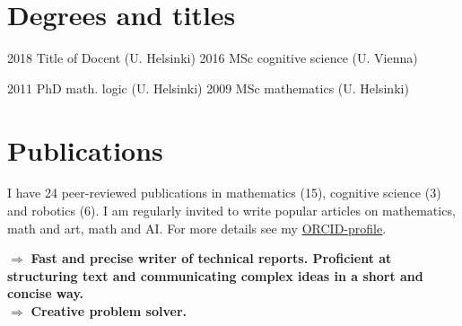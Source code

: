 \documentclass[letterpaper]{twentyonesecondcv}
\begin{document}
{\section{Degrees and titles}
   \vspace{-20pt}
   \begin{multicols}{2}
    \begin{twentyshort}
      \twentyitemshort
        {2018}
        {Title of Docent (U. Helsinki)}
      \twentyitemshort
        {2016}
        {MSc cognitive science (U. Vienna)}
    \end{twentyshort}
    \begin{twentyshort}
      \twentyitemshort
        {2011}
        {PhD math. logic (U. Helsinki)}
      \twentyitemshort
        {2009}
        {MSc mathematics (U. Helsinki)}
    \end{twentyshort}
   \end{multicols}

   \vspace{-20pt}

    \section{Publications}    

    
      \noindent I have 24 peer-reviewed publications in
      mathematics (15), cognitive science (3) and robotics (6).
      I am regularly invited to write
      popular articles on mathematics, math and art, math and AI. For more details
      see my \href{https://orcid.org/0000-0001-5197-5017}{\underline{ORCID-profile}}.
     
      $\Rightarrow$ \textbf{Fast and precise writer of technical reports. 
      Proficient at structuring text and communicating complex ideas
      in a short and concise way.}\\
      $\Rightarrow$ \textbf{Creative problem solver.}

}
\end{document}
